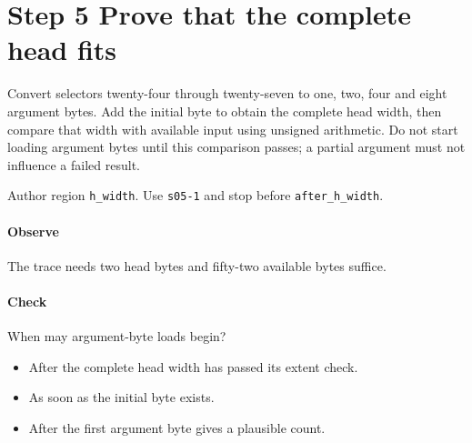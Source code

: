 \section{Step 5 Prove that the complete head fits}\label{cbor-s05}
Convert selectors twenty-four through twenty-seven to one, two, four and eight argument bytes. Add the initial byte to obtain the complete head width, then compare that width with available input using unsigned arithmetic. Do not start loading argument bytes until this comparison passes; a partial argument must not influence a failed result.

Author region \texttt{h\_width}. Use \texttt{s05-1} and stop before \texttt{after\_h\_width}.

\paragraph{Observe} The trace needs two head bytes and fifty-two available bytes suffice.

\paragraph{Check} When may argument-byte loads begin?
\begin{itemize}
  \item[A.] After the complete head width has passed its extent check.
  \item[B.] As soon as the initial byte exists.
  \item[C.] After the first argument byte gives a plausible count.
\end{itemize}
